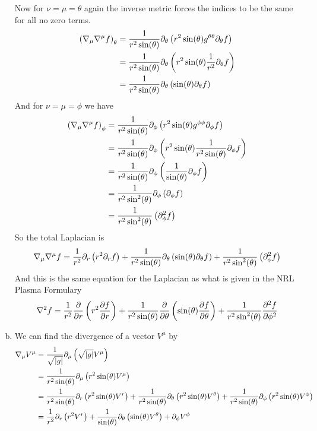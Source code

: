 \documentclass[11pt]{article}
\numberwithin{equation}{section}
\begin{document}
\begin{enumerate}[(a)]
Now for $\nu=\mu=\theta$ again the inverse metric forces the indices to be the same for all no zero terms.
\begin{align*}
\left(\bold\nabla_{\mu}\bold\nabla^{\mu}f\right)_{\theta} &= \frac{1}{r^2\sin(\theta)}\partial_{\theta}\left(r^2\sin(\theta)g^{\theta\theta}\partial_{\theta}f\right)\\
&= \frac{1}{r^2\sin(\theta)}\partial_{\theta}\left(r^2\sin(\theta)\frac{1}{r^2}\partial_{\theta}f\right)\\
&= \frac{1}{r^2\sin(\theta)}\partial_{\theta}\left(\sin(\theta)\partial_{\theta}f\right)
\end{align*}
And for $\nu=\mu=\phi$ we have
\begin{align*}
\left(\bold\nabla_{\mu}\bold\nabla^{\mu}f\right)_{\phi} &= \frac{1}{r^2\sin(\theta)}\partial_{\phi}\left(r^2\sin(\theta)g^{\phi\phi}\partial_{\phi}f\right)\\
&= \frac{1}{r^2\sin(\theta)}\partial_{\phi}\left(r^2\sin(\theta)\frac{1}{r^2\sin(\theta)}\partial_{\phi}f\right)\\
&= \frac{1}{r^2\sin(\theta)}\partial_{\phi}\left(\frac{1}{\sin(\theta)}\partial_{\phi}f\right)\\
&= \frac{1}{r^2\sin^2(\theta)}\partial_{\phi}\left(\partial_{\phi}f\right)\\
&= \frac{1}{r^2\sin^2(\theta)}\left(\partial^2_{\phi}f\right)
\end{align*}
So the total Laplacian is 
$$ \bold\nabla_{\mu}\bold\nabla^{\mu}f = \frac{1}{r^2}\partial_{r}\left(r^2\partial_{r}f\right) +\frac{1}{r^2\sin(\theta)}\partial_{\theta}\left(\sin(\theta)\partial_{\theta}f\right) +\frac{1}{r^2\sin^2(\theta)}\left(\partial^2_{\phi}f\right)$$
And this is the same equation for the Laplacian as what is given in the NRL Plasma Formulary 
$$\bold\nabla^2f = \frac{1}{r^2}\frac{\partial}{\partial r}\left(r^2\frac{\partial{f}}{\partial{r}}\right) + \frac{1}{r^2\sin(\theta)}\frac{\partial{}}{\partial{\theta}}\left(\sin(\theta)\frac{\partial{f}}{\partial{\theta}}\right) + \frac{1}{r^2\sin^2(\theta)}\frac{\partial^2f}{\partial\phi^2}$$

\item
We can find the divergence of a vector $V^{\mu}$ by
\begin{align*}
\bold\nabla_{\mu}V^{\mu} &= \frac{1}{\sqrt{|g|}}\partial_{\mu}\left(\sqrt{|g|}V^{\mu}\right)\\
&= \frac{1}{r^2\sin(\theta)}\partial_{\mu}\left(r^2\sin(\theta)V^{\mu}\right)\\
&= \frac{1}{r^2\sin(\theta)}\partial_{r}\left(r^2\sin(\theta)V^{r}\right) + \frac{1}{r^2\sin(\theta)}\partial_{\theta}\left(r^2\sin(\theta)V^{\theta}\right) + \frac{1}{r^2\sin(\theta)}\partial_{\phi}\left(r^2\sin(\theta)V^{\phi}\right)\\
&= \frac{1}{r^2}\partial_{r}\left(r^2V^{r}\right) + \frac{1}{\sin(\theta)}\partial_{\theta}\left(\sin(\theta)V^{\theta}\right) + \partial_{\phi}V^{\phi}
\end{align*}


\end{enumerate}
\end{document}
